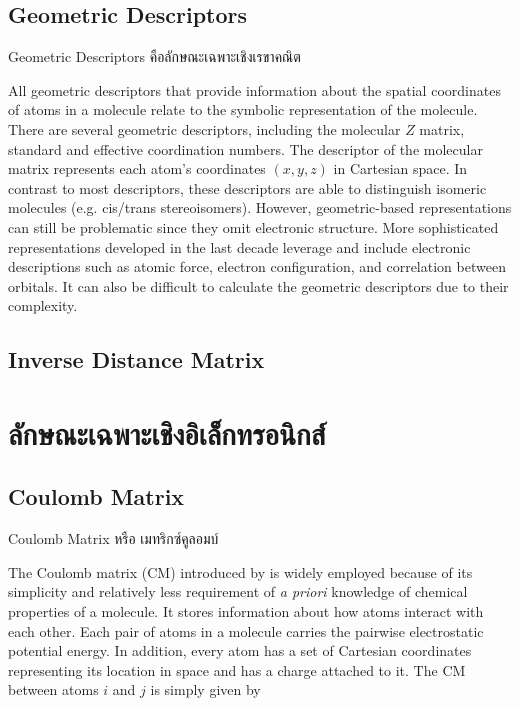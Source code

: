 \subsection{Geometric Descriptors}

Geometric Descriptors คือลักษณะเฉพาะเชิงเรขาคณิต

All geometric descriptors that provide information about the spatial coordinates of atoms in 
a molecule relate to the symbolic representation of the molecule. There are several geometric descriptors, 
including the molecular $Z$ matrix, standard and effective coordination numbers. 
The descriptor of the molecular matrix represents each atom's coordinates $(x, y, z)$ in Cartesian space. 
In contrast to most descriptors, these descriptors are able to distinguish isomeric molecules 
(e.g. cis/trans stereoisomers). However, geometric-based representations can still be problematic 
since they omit electronic structure. More sophisticated representations developed in 
the last decade leverage and include electronic descriptions such as atomic force, electron configuration, 
and correlation between orbitals.\cite{musil2021} It can also be difficult to calculate 
the geometric descriptors due to their complexity.\cite{keith2021}

\subsection{Inverse Distance Matrix}

\section{ลักษณะเฉพาะเชิงอิเล็กทรอนิกส์}

\subsection{Coulomb Matrix}

Coulomb Matrix หรือ เมทริกซ์คูลอมบ์

The Coulomb matrix (CM) introduced by \citeauthor{rupp2012} is widely employed because of its simplicity 
and relatively less requirement of \textit{a priori} knowledge of chemical properties of a molecule.\cite{rupp2012}
It stores information about how atoms interact with each other. Each pair of atoms in a molecule carries 
the pairwise electrostatic potential energy. In addition, every atom has a set of Cartesian coordinates 
representing its location in space and has a charge attached to it. The CM between atoms $i$ and $j$ 
is simply given by

